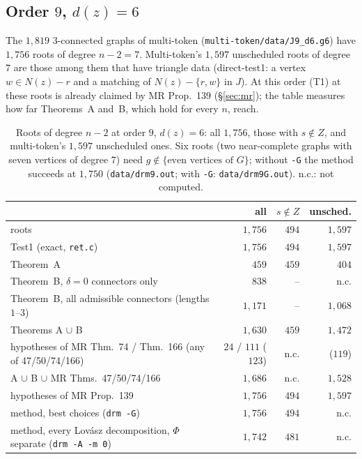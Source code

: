 \documentclass[11pt]{amsart}
\theoremstyle{definition}
\begin{document}
\subsection*{Order $9$, $d(z)=6$} The $1{,}819$ $3$-connected graphs of multi-token
(\texttt{multi-token/data/J9\_d6.g6}) have $1{,}756$ roots of degree $n-2=7$. Multi-token's
$1{,}597$ unscheduled roots of degree $7$ are those among them that have triangle data (direct-test1:
a vertex $w\in N(z)-r$ and a matching of $N(z)-\{r,w\}$ in $J$). At this order (T1) at these roots is
already claimed by MR Prop.~139 (\S\ref{sec:mr}); the table measures how far Theorems~A and~B, which
hold for every $n$, reach.

\begin{table}[h]\footnotesize
\begin{tabular}{@{}>{\raggedright\arraybackslash}p{}rrr@{}}
\toprule
 & all & $s\notin Z$ & unsched.\\
\midrule
roots & $1{,}756$ & $494$ & $1{,}597$\\
Test1 (exact, \texttt{ret.c}) & $1{,}756$ & $494$ & $1{,}597$\\
Theorem~A & $459$ & $459$ & $404$\\
Theorem~B, $\delta=0$ connectors only & $838$ & -- & n.c.\\
Theorem~B, all admissible connectors (lengths $1$--$3$) & $1{,}171$ & -- & $1{,}068$\\
Theorems A $\cup$ B & $1{,}630$ & $459$ & $1{,}472$\\
hypotheses of MR Thm.~74 / Thm.~166 (any of 47/50/74/166) & $24$ / $111$ ($123$) & n.c. & ($119$)\\
A $\cup$ B $\cup$ MR Thms.~47/50/74/166 & $1{,}686$ & n.c. & $1{,}528$\\
hypotheses of MR Prop.~139 & $1{,}756$ & $494$ & $1{,}597$\\
method, best choices (\texttt{drm -G}) & $1{,}756$ & $494$ & n.c.\\
method, every Lov\'asz decomposition, $\Phi$ separate (\texttt{drm -A -m 0}) & $1{,}742$ & $481$ & n.c.\\
\bottomrule
\end{tabular}
\caption{Roots of degree $n-2$ at order $9$, $d(z)=6$: all $1{,}756$, those with $s\notin Z$, and
multi-token's $1{,}597$ unscheduled ones. Six roots (two near-complete graphs with seven
vertices of degree $7$) need $g\notin\{\text{even vertices of }G\}$; without \texttt{-G} the method
succeeds at $1{,}750$ (\texttt{data/drm9.out}; with \texttt{-G}: \texttt{data/drm9G.out}). n.c.: not
computed.}\label{tab:o9}
\end{table}
\end{document}
